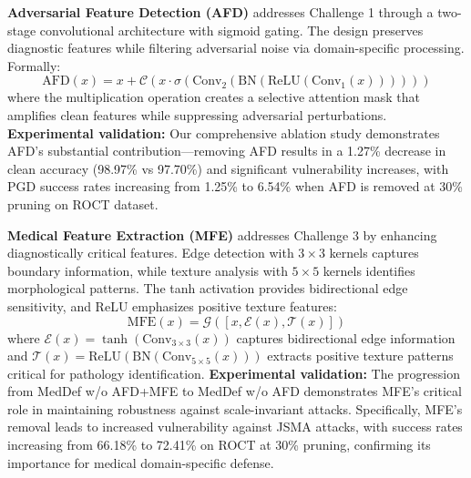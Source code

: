 \documentclass[preprint,12pt]{elsarticle}
\begin{document}
\textbf{Adversarial Feature Detection (AFD)} addresses Challenge 1 through a two-stage convolutional architecture with sigmoid gating. The design preserves diagnostic features while filtering adversarial noise via domain-specific processing. Formally:
\begin{equation}
\text{AFD}(x) = x + \mathcal{C}(x \cdot \sigma(\text{Conv}_2(\text{BN}(\text{ReLU}(\text{Conv}_1(x))))))
\end{equation}
where the multiplication operation creates a selective attention mask that amplifies clean features while suppressing adversarial perturbations. \textbf{Experimental validation:} Our comprehensive ablation study demonstrates AFD's substantial contribution—removing AFD results in a 1.27\% decrease in clean accuracy (98.97\% vs 97.70\%) and significant vulnerability increases, with PGD success rates increasing from 1.25\% to 6.54\% when AFD is removed at 30\% pruning on ROCT dataset.

\textbf{Medical Feature Extraction (MFE)} addresses Challenge 3 by enhancing diagnostically critical features. Edge detection with $3 \times 3$ kernels captures boundary information, while texture analysis with $5 \times 5$ kernels identifies morphological patterns. The tanh activation provides bidirectional edge sensitivity, and ReLU emphasizes positive texture features:
\begin{equation}
\text{MFE}(x) = \mathcal{G}([x, \mathcal{E}(x), \mathcal{T}(x)])
\end{equation}
where $\mathcal{E}(x) = \tanh(\text{Conv}_{3 \times 3}(x))$ captures bidirectional edge information and $\mathcal{T}(x) = \text{ReLU}(\text{BN}(\text{Conv}_{5 \times 5}(x)))$ extracts positive texture patterns critical for pathology identification. \textbf{Experimental validation:} The progression from MedDef w/o AFD+MFE to MedDef w/o AFD demonstrates MFE's critical role in maintaining robustness against scale-invariant attacks. Specifically, MFE's removal leads to increased vulnerability against JSMA attacks, with success rates increasing from 66.18\% to 72.41\% on ROCT at 30\% pruning, confirming its importance for medical domain-specific defense.
\end{document}
